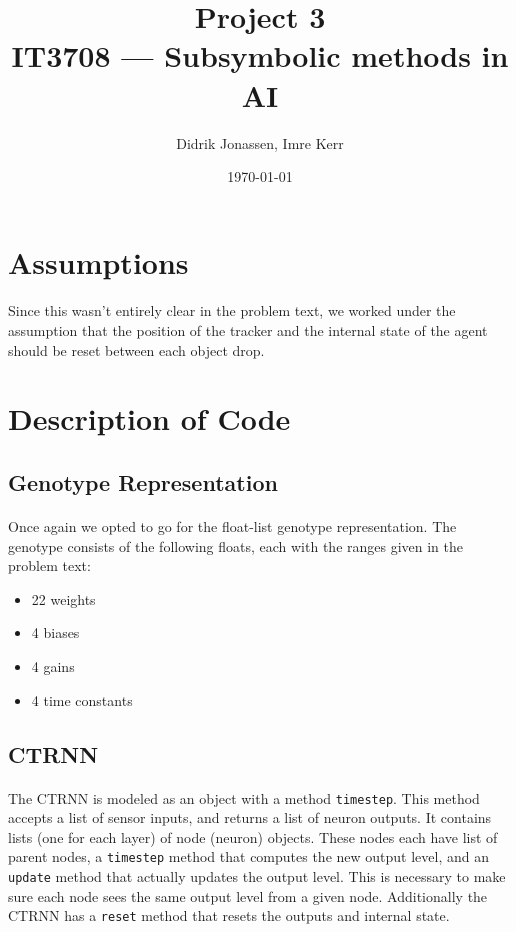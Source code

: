 \documentclass[a4paper,12pt]{article}
\author{Didrik Jonassen, Imre Kerr\vspace{-2ex}}
\title{\vspace{-5ex}Project 3\\ IT3708 --- Subsymbolic methods in AI}
\date{\today}
\begin{document}
\maketitle

\section{Assumptions}
\paragraph{}Since this wasn't entirely clear in the problem text, we worked under the assumption that the position of the tracker and the internal state of the agent should be reset between each object drop.

\section{Description of Code}
\subsection{Genotype Representation}
\paragraph{}Once again we opted to go for the float-list genotype representation. The genotype consists of the following floats, each with the ranges given in the problem text:
\begin{itemize}
\item{22 weights}
\item{4 biases}
\item{4 gains}
\item{4 time constants}
\end{itemize}

\subsection{CTRNN}
\paragraph{}The CTRNN is modeled as an object with a method \texttt{timestep}. This method accepts a list of sensor inputs, and returns a list of neuron outputs. It contains lists (one for each layer) of node (neuron) objects. These nodes each have list of parent nodes, a \texttt{timestep} method that computes the new output level, and an \texttt{update} method that actually updates the output level. This is necessary to make sure each node sees the same output level from a given node. Additionally the CTRNN has a \texttt{reset} method that resets the outputs and internal state.
\end{document}
